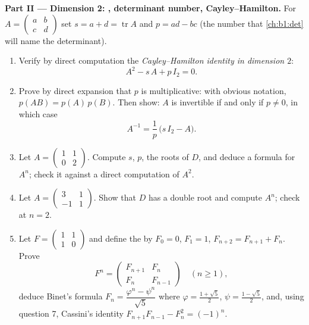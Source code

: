 \begin{problem}
\medskip
\noindent\textbf{Part II --- Dimension 2: , determinant
number, Cayley--Hamilton.} For $A = \begin{pmatrix} a & b\\ c &
d\end{pmatrix}$ set $s = a + d = \operatorname{tr} A$ and $p = ad
- bc$ (the number that \cref{ch:b1:det} will name the
determinant).
\begin{enumerate}[resume]
  \item Verify by direct computation the \emph{Cayley--Hamilton
        identity in dimension $2$}:
        \[
        A^2 - s\,A + p\,I_2 = 0 .
        \]
  \item Prove by direct expansion that $p$ is multiplicative:
        with obvious notation, $p(AB) = p(A)\,p(B)$. Then show:
        $A$ is invertible if and only if $p \neq 0$, in which
        case
        \[
        A^{-1} = \frac1p\,\bigl(s\,I_2 - A\bigr).
        \]
  \item Let $A = \begin{pmatrix} 1 & 1\\ 0 & 2\end{pmatrix}$.
        Compute $s$, $p$, the roots of $D$, and deduce a 
        formula for $A^n$; check it against a direct computation
        of $A^2$.
  \item Let $A = \begin{pmatrix} 3 & 1\\ -1 & 1\end{pmatrix}$.
        Show that $D$ has a double root and compute $A^n$; check
        at $n = 2$.
  \item Let $F = \begin{pmatrix} 1 & 1\\ 1 & 0\end{pmatrix}$ and
        define the  by $F_0 = 0$, $F_1 = 1$,
        $F_{n+2} = F_{n+1} + F_n$. Prove
        \[
        F^n = \begin{pmatrix} F_{n+1} & F_n\\ F_n &
        F_{n-1}\end{pmatrix} \quad (n \geq 1),
        \]
        deduce Binet's formula $F_n = \dfrac{\varphi^n -
        \psi^n}{\sqrt5}$ where $\varphi = \frac{1 + \sqrt5}2$,
        $\psi = \frac{1 - \sqrt5}2$, and, using question 7,
        Cassini's identity $F_{n+1}F_{n-1} - F_n^2 = (-1)^n$.
\end{enumerate}


\end{problem}
